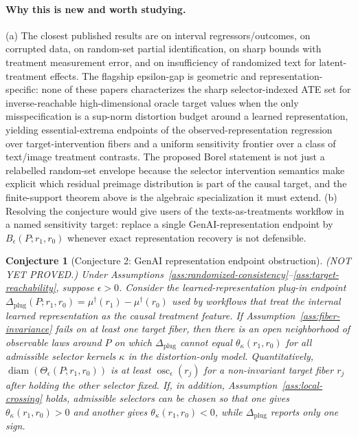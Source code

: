 \documentclass[11pt]{article}
\theoremstyle{definition}
\theoremstyle{plain}
\newtheorem{conjecture}{Conjecture}
\theoremstyle{remark}
\begin{document}
\paragraph{Why this is new and worth studying.}
(a) The closest published results are \citet{ManskiTamer2002} on interval regressors/outcomes, \citet{HorowitzManski1995} on corrupted data, \citet{BeresteanuMolchanovMolinari2012} on random-set partial identification, \citet{Ura2018} on sharp bounds with treatment measurement error, and \citet{FongGrimmer2023} on insufficiency of randomized text for latent-treatment effects.  The flagship epsilon-gap is geometric and representation-specific: none of these papers characterizes the sharp selector-indexed ATE set for inverse-reachable high-dimensional oracle target values when the only misspecification is a sup-norm distortion budget around a learned representation, yielding essential-extrema endpoints of the observed-representation regression over target-intervention fibers and a uniform sensitivity frontier over a class of text/image treatment contrasts.  The proposed Borel statement is not just a relabelled random-set envelope because the selector intervention semantics make explicit which residual preimage distribution is part of the causal target, and the finite-support theorem above is the algebraic specialization it must extend.  (b) Resolving the conjecture would give users of the texts-as-treatments workflow in \citet{ImaiNakamura2024TextTreatments} a named sensitivity target: replace a single GenAI-representation endpoint by \(B_\epsilon(P;r_1,r_0)\) whenever exact representation recovery is not defensible.

\begin{conjecture}[Conjecture 2: GenAI representation endpoint obstruction]\label{conj:single-endpoint-impossibility}
(NOT YET PROVED.)  Under Assumptions~\ref{ass:randomized-consistency}--\ref{ass:target-reachability}, suppose \(\epsilon>0\).  Consider the learned-representation plug-in endpoint \(\Delta_{\mathrm{plug}}(P;r_1,r_0)=\mu^\dagger(r_1)-\mu^\dagger(r_0)\) used by workflows that treat the internal learned representation as the causal treatment feature.  If Assumption~\ref{ass:fiber-invariance} fails on at least one target fiber, then there is an open neighborhood of observable laws around \(P\) on which \(\Delta_{\mathrm{plug}}\) cannot equal \(\theta_\kappa(r_1,r_0)\) for all admissible selector kernels \(\kappa\) in the distortion-only model.  Quantitatively, \(\operatorname{diam}(\Theta_\epsilon(P;r_1,r_0))\) is at least \(\operatorname{osc}_\epsilon(r_j)\) for a non-invariant target fiber \(r_j\) after holding the other selector fixed.  If, in addition, Assumption~\ref{ass:local-crossing} holds, admissible selectors can be chosen so that one gives \(\theta_\kappa(r_1,r_0)>0\) and another gives \(\theta_\kappa(r_1,r_0)<0\), while \(\Delta_{\mathrm{plug}}\) reports only one sign.
\end{conjecture}
\end{document}

